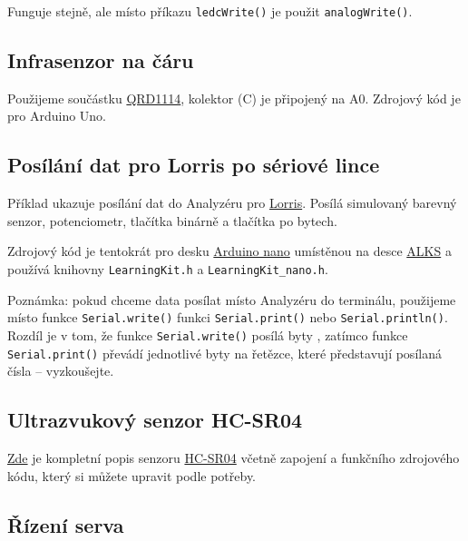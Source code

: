 
 
Funguje stejně, ale místo příkazu {\tt ledcWrite()} je použit {\tt analogWrite()}.

\subsection{Infrasenzor na čáru} \label{prog:qrd1114}

Použijeme součástku \hyperref[qrd1114]{QRD1114}, kolektor (C) je připojený na A0. Zdrojový kód je pro Arduino Uno. 




\subsection{Posílání dat pro Lorris po sériové lince} \label{prog:lorris}

Příklad ukazuje posílání dat do Analyzéru pro \hyperref[lorris]{Lorris}.
 Posílá simulovaný barevný senzor, potenciometr, tlačítka binárně a tlačítka po bytech. 

Zdrojový kód je tentokrát pro desku \hyperref[alks:nano]{Arduino nano}
 umístěnou na desce \hyperref[alks]{ALKS} a používá knihovny
{\tt LearningKit.h}  a  {\tt LearningKit\_nano.h}. 

Poznámka: pokud chceme data posílat místo Analyzéru do terminálu, použijeme místo funkce {\tt Serial.write()}
funkci {\tt Serial.print()} nebo {\tt Serial.println()}. Rozdíl je v tom, že funkce {\tt Serial.write()} posílá byty , zatímco funkce {\tt Serial.print()} převádí jednotlivé byty na řetězce, které představují posílaná čísla -- vyzkoušejte.   




\label{prog:sr04} 
\subsection{Ultrazvukový senzor HC-SR04} 

  \href{https://randomnerdtutorials.com/complete-guide-for-ultrasonic-sensor-hc-sr04/}{Zde}
je kompletní popis senzoru \hyperref[hcsr04]{HC-SR04} včetně zapojení a funkčního zdrojového kódu, který si můžete upravit podle potřeby.  


\label{prog:servo} 
\subsection{Řízení serva} 

